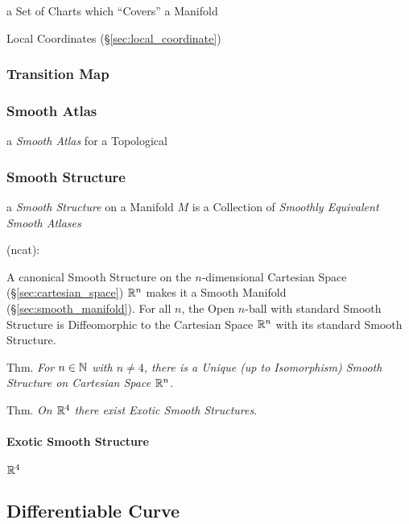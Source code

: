a Set of Charts which ``Covers'' a Manifold

\fist Local Coordinates (\S\ref{sec:local_coordinate})



\subsubsection{Transition Map}\label{sec:transition_map}

\subsubsection{Smooth Atlas}\label{sec:smooth_atlas}

a \emph{Smooth Atlas} for a Topological



\subsubsection{Smooth Structure}\label{sec:smooth_structure}

a \emph{Smooth Structure} on a Manifold $M$ is a Collection of \emph{Smoothly
  Equivalent Smooth Atlases}

(ncat):

A canonical Smooth Structure on the $n$-dimensional Cartesian Space
(\S\ref{sec:cartesian_space}) $\mathbb{R}^n$ makes it a Smooth Manifold
(\S\ref{sec:smooth_manifold}). For all $n$, the Open $n$-ball with standard
Smooth Structure is Diffeomorphic to the Cartesian Space $\mathbb{R}^n$ with its
standard Smooth Structure.

Thm. \emph{For $n \in \mathbb{N}$ with $n \neq 4$, there is a Unique (up to
  Isomorphism) Smooth Structure on Cartesian Space $\mathbb{R}^n$}.

Thm. \emph{On $\mathbb{R}^4$ there exist Exotic Smooth Structures}.



\paragraph{Exotic Smooth Structure}\label{sec:smooth_structure}

$\mathbb{R}^4$



\subsection{Differentiable Curve}\label{sec:differentiable_curve}

